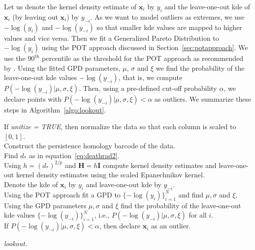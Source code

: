 \documentclass[letter,12pt]{article}
\begin{document}
Let us denote the kernel density estimate of $\bm{x}_i$ by $y_i$ and the leave-one-out kde of $\bm{x}_i$ (by leaving out $\bm{x}_i$) by $y_{-i}$. As we want to model outliers as extremes, we use $-\log(y_i)$ and $-\log(y_{-i})$ so that smaller kde values are mapped to higher values and vice versa.  Then we fit a Generalized Pareto Distribution to  $-\log(y_i)$ using the POT approach discussed in Section~\ref{sec:potapproach}. We use the $90^{\text{th}}$ percentile as the threshold for the POT approach as recommended by \cite{bommier2014peaks}. Using the fitted GPD parameters, $\mu$, $\sigma$ and $\xi$ we find the probability of the  leave-one-out kde values $-\log(y_{-i})$, that is,  we compute $P\left(-\log(y_{-i})|\mu, \sigma,\xi \right)$. Then, using a pre-defined cut-off probability $\alpha$, we declare points with $P\left(-\log(y_{-i})|\mu, \sigma,\xi \right) < \alpha$ as outliers. We summarize these steps in Algorithm~\ref{algo:lookout}.
\DontPrintSemicolon
\begin{algorithm}\fontsize{11}{12}\selectfont
	 If \textit{unitize = TRUE}, then normalize the data so that each column is scaled to $[0,1]$.\\
	 Construct the persistence homology barcode of the data. \\
	 Find $d_*$ as in equation~\eqref{eq:deathrad2}. \\
	 Using $h = (d_*)^{2/p}$ and $\bm{H} = h\bm{I}$ compute kernel density estimates  and leave-one-out kernel density estimates using the scaled Epanechnikov kernel. \\
	 Denote the kde of $\bm{x}_i$ by $y_i$ and leave-one-out kde by $y_{-i}$.\\
	 Using the POT approach fit a GPD to $\{-\log(y_i)\}_{i=1}^N$ and find $\mu, \sigma$ and $\xi$. \\
	 Using the GPD parameters $\mu, \sigma$ and $\xi$ find the probability of the leave-one-out kde values $\{-\log(y_{-i})\}_{i=1}^N$, i.e., $P\left(-\log(y_{-i})|\mu, \sigma, \xi \right)$ for all $i$. \\
	 If $P\left(-\log(y_{-i})|\mu, \sigma, \xi \right) < \alpha$, then declare $\bm{x}_i$ as an outlier. 
	\caption{\itshape lookout.}
	\label{algo:lookout}
\end{algorithm}
\end{document}
